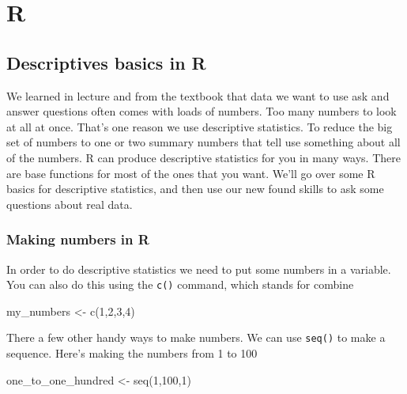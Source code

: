 \documentclass[
]{book}
\newenvironment{Shaded}{\begin{snugshade}}{\end{snugshade}}
\newcommand{\DecValTok}[1]{\textcolor[rgb]{0.00,0.00,0.81}{#1}}
\newcommand{\FunctionTok}[1]{\textcolor[rgb]{0.00,0.00,0.00}{#1}}
\newcommand{\NormalTok}[1]{#1}
\newcommand{\OtherTok}[1]{\textcolor[rgb]{0.56,0.35,0.01}{#1}}
\begin{document}
\hypertarget{r-2}{%
\section{R}\label{r-2}}

\hypertarget{descriptives-basics-in-r}{%
\subsection{Descriptives basics in R}\label{descriptives-basics-in-r}}

We learned in lecture and from the textbook that data we want to use ask and answer questions often comes with loads of numbers. Too many numbers to look at all at once. That's one reason we use descriptive statistics. To reduce the big set of numbers to one or two summary numbers that tell use something about all of the numbers. R can produce descriptive statistics for you in many ways. There are base functions for most of the ones that you want. We'll go over some R basics for descriptive statistics, and then use our new found skills to ask some questions about real data.

\hypertarget{making-numbers-in-r}{%
\subsubsection{Making numbers in R}\label{making-numbers-in-r}}

In order to do descriptive statistics we need to put some numbers in a variable. You can also do this using the \texttt{c()} command, which stands for combine

\begin{Shaded}
\begin{Highlighting}[]
\NormalTok{my\_numbers }\OtherTok{\textless{}{-}} \FunctionTok{c}\NormalTok{(}\DecValTok{1}\NormalTok{,}\DecValTok{2}\NormalTok{,}\DecValTok{3}\NormalTok{,}\DecValTok{4}\NormalTok{)}
\end{Highlighting}
\end{Shaded}

There a few other handy ways to make numbers. We can use \texttt{seq()} to make a sequence. Here's making the numbers from 1 to 100

\begin{Shaded}
\begin{Highlighting}[]
\NormalTok{one\_to\_one\_hundred }\OtherTok{\textless{}{-}} \FunctionTok{seq}\NormalTok{(}\DecValTok{1}\NormalTok{,}\DecValTok{100}\NormalTok{,}\DecValTok{1}\NormalTok{)}
\end{Highlighting}
\end{Shaded}
\end{document}
